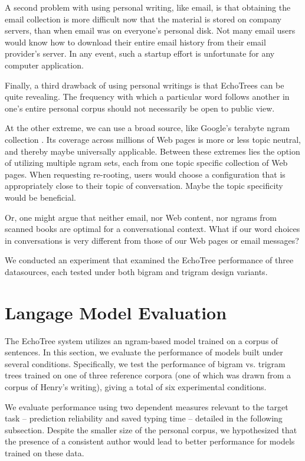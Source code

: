 \documentclass{sigchi}
\begin{document}
A second problem with using personal writing, like email, is that
obtaining the email collection is more difficult now that the material
is stored on company servers, than when email was on everyone's
personal disk. Not many email users would know how to download their
entire email history from their email provider's server. In any event,
such a startup effort is unfortunate for any computer application.

Finally, a third drawback of using personal writings is that EchoTrees
can be quite revealing. The frequency with which a particular word
follows another in one's entire personal corpus should not necessarily
be open to public view.

At the other extreme, we can use a broad source, like Google's
terabyte ngram collection \cite{google1T}. Its coverage across
millions of Web pages is more or less topic neutral, and thereby maybe
universally applicable. Between these extremes lies the option of
utilizing multiple ngram sets, each from one topic specific collection
of Web pages. When requesting re-rooting, users would choose a
configuration that is appropriately close to their topic of
conversation. Maybe the topic specificity would be beneficial.

Or, one might argue that neither email, nor Web content, nor ngrams
from scanned books \cite{anc} are optimal for a conversational
context. What if our word choices in conversations is very different
from those of our Web pages or email messages?

We conducted an experiment that examined the EchoTree performance of
three datasources, each tested under both bigram and trigram design
variants.

\section{Langage Model Evaluation}

The EchoTree system utilizes an ngram-based model trained on a corpus of sentences. In this section, we evaluate the performance of models built under several conditions. Specifically, we test the performance of bigram vs. trigram trees trained on one of three reference corpora (one of which was drawn from a corpus of Henry's writing), giving a total of six experimental conditions. 

We evaluate performance using two dependent measures relevant to the target task -- prediction reliability and saved typing time -- detailed in the following subsection. Despite the smaller size of the personal corpus, we hypothesized that the presence of a consistent author would lead to better performance for models trained on these data.
\end{document}
